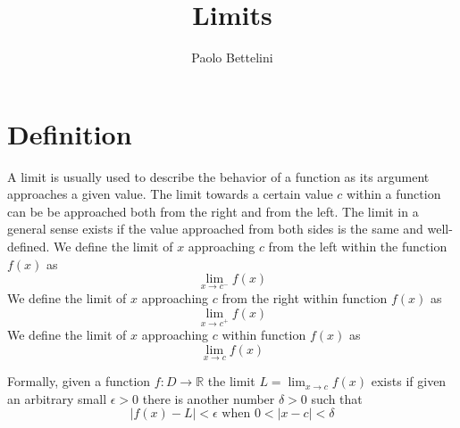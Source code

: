 \documentclass{article}
\title{Limits}
\author{Paolo Bettelini}
\date{}
\begin{document}
\maketitle
\tableofcontents
\pagebreak

\section{Definition}

A limit is usually used to describe the behavior of a function as its argument approaches a given value.
The limit towards a certain value \(c\) within a function can be be approached both from the right and from the left.
The limit in a general sense exists if the value approached from both sides is the same and well-defined.
We define the limit of \(x\) approaching \(c\) from the left within the function \(f(x)\) as
\[
    \lim_{x\to c^{-}}f(x)
\]
We define the limit of \(x\) approaching \(c\) from the right within function \(f(x)\) as
\[
    \lim_{x\to c^{+}}f(x)
\]
We define the limit of \(x\) approaching \(c\) within function \(f(x)\) as
\[
    \lim_{x\to c}f(x)
\]

Formally, given a function \(f:D\to \mathbb{R}\) the limit \(L=\lim_{x\to c}f(x)\) exists if given an arbitrary small \(\epsilon >0\) there is another number \(\delta >0\) such that
\[
    |f(x)-L|<\epsilon
    \text{ when }
    0<|x-c|<\delta
\]

\begin{center}
\end{center}
\end{document}
